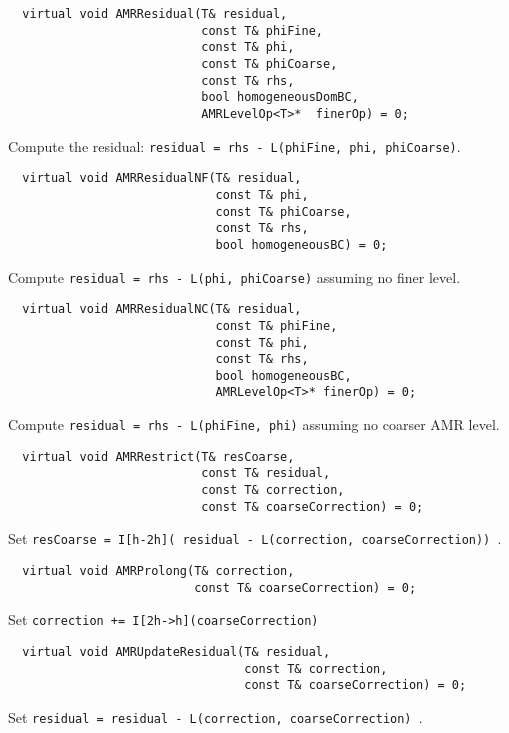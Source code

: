 \begin{itemize}
\begin{itemize}
\begin{itemize}
\begin{itemize}
\begin{itemize}
\begin{itemize}
\begin{itemize}
\begin{itemize}
\begin{itemize}
\begin{itemize}
\begin{itemize}
\I 
\begin{verbatim}
  virtual void AMRResidual(T& residual, 
                           const T& phiFine, 
                           const T& phi,
                           const T& phiCoarse, 
                           const T& rhs,
                           bool homogeneousDomBC,
                           AMRLevelOp<T>*  finerOp) = 0;
\end{verbatim}
 Compute the residual:  {\tt residual = rhs - L(phiFine, phi, phiCoarse)}.

\I  
\begin{verbatim}
  virtual void AMRResidualNF(T& residual, 
                             const T& phi, 
                             const T& phiCoarse,
                             const T& rhs, 
                             bool homogeneousBC) = 0;
\end{verbatim}
Compute {\tt residual = rhs - L(phi, phiCoarse)} assuming no
                             finer level.  

\I 
\begin{verbatim}
  virtual void AMRResidualNC(T& residual, 
                             const T& phiFine, 
                             const T& phi,
                             const T& rhs, 
                             bool homogeneousBC,
                             AMRLevelOp<T>* finerOp) = 0;
\end{verbatim}
 Compute {\tt residual = rhs - L(phiFine, phi)}   assuming no coarser AMR level.

\I  
\begin{verbatim}
  virtual void AMRRestrict(T& resCoarse, 
                           const T& residual, 
                           const T& correction,
                           const T& coarseCorrection) = 0;
\end{verbatim}
 Set {\tt resCoarse = I[h-2h]( residual - L(correction, coarseCorrection)) }.

\I 
\begin{verbatim}
  virtual void AMRProlong(T& correction, 
                          const T& coarseCorrection) = 0;
\end{verbatim}
Set {\tt correction += I[2h->h](coarseCorrection)}

\I 
\begin{verbatim}
  virtual void AMRUpdateResidual(T& residual, 
                                 const T& correction,
                                 const T& coarseCorrection) = 0;
\end{verbatim}
Set {\tt residual = residual - L(correction,   coarseCorrection) }.



\end{itemize}
\end{itemize}
\end{itemize}
\end{itemize}
\end{itemize}
\end{itemize}
\end{itemize}
\end{itemize}
\end{itemize}
\end{itemize}
\end{itemize}
